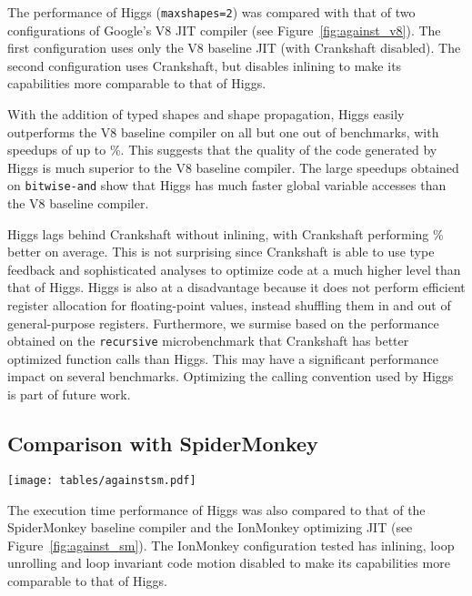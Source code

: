 \documentclass[preprint]{sigplanconf}
\newcommand{\stat}[1]{\unskip}
\newcommand{\percentstat}[1]{\unskip\%}
\begin{document}
The performance of Higgs ({\tt maxshapes=2}) was compared
with that of two configurations of Google's V8 JIT compiler (see
Figure~\ref{fig:against_v8}). The first configuration uses only the V8 baseline
JIT (with Crankshaft disabled). The second configuration uses Crankshaft,
but disables inlining to make its capabilities more comparable to that of Higgs.

With the addition of typed shapes and shape propagation, Higgs easily
outperforms the V8 baseline compiler on all but one out of \stat{num_benchs}
benchmarks, with speedups of up to \percentstat{againstv8_max_v8_baseline}.
This suggests that the quality of the code generated by Higgs is much superior
to the V8 baseline compiler. The large speedups obtained on {\tt bitwise-and}
show that Higgs has much faster global variable accesses than the V8 baseline
compiler.

Higgs lags behind Crankshaft without inlining, with Crankshaft
performing \percentstat{againstv8_decr_v8_no_inlining} better on average. This
is not surprising since Crankshaft is able to use type feedback and
sophisticated analyses to optimize code at a much higher level than that of
Higgs. Higgs is also at a disadvantage because it does not perform efficient
register allocation for floating-point values, instead shuffling them in and
out of general-purpose registers. Furthermore, we surmise based on the
performance obtained on the {\tt recursive} microbenchmark that Crankshaft
has better optimized function calls than Higgs. This may have a significant
performance impact on several benchmarks. Optimizing the calling convention
used by Higgs is part of future work.

\subsection{Comparison with SpiderMonkey}

\begin{figure*}[tb]
    \begin{center}
    \texttt{[image: tables/againstsm.pdf]}
    \end{center}
\caption{Speed relative to SpiderMonkey baseline and SpiderMonkey without inlining (log scale, bars above 100\% favor Higgs)\label{fig:against_sm}}
\end{figure*}

The execution time performance of Higgs was also compared to that of the
SpiderMonkey baseline compiler and the IonMonkey optimizing JIT (see
Figure~\ref{fig:against_sm}). The IonMonkey configuration tested has inlining,
loop unrolling and loop invariant code motion disabled to make its capabilities
more comparable to that of Higgs.
\end{document}
